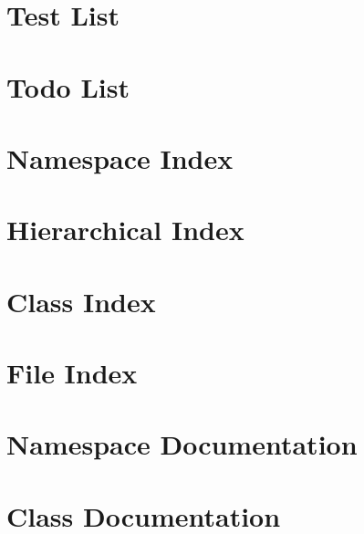 \documentclass{book}
\begin{document}
\chapter{Test List}
\label{test}
\hypertarget{test}{}

\chapter{Todo List}
\label{todo}
\hypertarget{todo}{}

\chapter{Namespace Index}

\chapter{Hierarchical Index}

\chapter{Class Index}

\chapter{File Index}

\chapter{Namespace Documentation}


\chapter{Class Documentation}





































\end{document}
